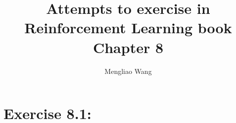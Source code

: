\documentclass[10pt,letterpaper]{article}
\title{Attempts to exercise in Reinforcement Learning book Chapter 8}
\author{Mengliao Wang}
\begin{document}
\maketitle



\section*{Exercise 8.1: }
\label{8.1}


\clearpage
\end{document}
